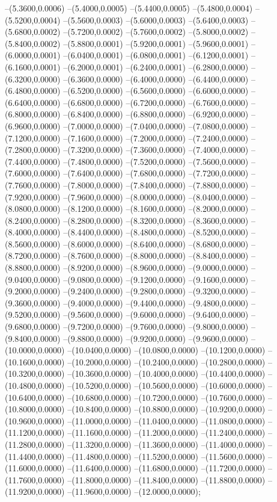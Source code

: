 {	--(5.3600,0.0006)
	--(5.4000,0.0005)
	--(5.4400,0.0005)
	--(5.4800,0.0004)
	--(5.5200,0.0004)
	--(5.5600,0.0003)
	--(5.6000,0.0003)
	--(5.6400,0.0003)
	--(5.6800,0.0002)
	--(5.7200,0.0002)
	--(5.7600,0.0002)
	--(5.8000,0.0002)
	--(5.8400,0.0002)
	--(5.8800,0.0001)
	--(5.9200,0.0001)
	--(5.9600,0.0001)
	--(6.0000,0.0001)
	--(6.0400,0.0001)
	--(6.0800,0.0001)
	--(6.1200,0.0001)
	--(6.1600,0.0001)
	--(6.2000,0.0001)
	--(6.2400,0.0001)
	--(6.2800,0.0000)
	--(6.3200,0.0000)
	--(6.3600,0.0000)
	--(6.4000,0.0000)
	--(6.4400,0.0000)
	--(6.4800,0.0000)
	--(6.5200,0.0000)
	--(6.5600,0.0000)
	--(6.6000,0.0000)
	--(6.6400,0.0000)
	--(6.6800,0.0000)
	--(6.7200,0.0000)
	--(6.7600,0.0000)
	--(6.8000,0.0000)
	--(6.8400,0.0000)
	--(6.8800,0.0000)
	--(6.9200,0.0000)
	--(6.9600,0.0000)
	--(7.0000,0.0000)
	--(7.0400,0.0000)
	--(7.0800,0.0000)
	--(7.1200,0.0000)
	--(7.1600,0.0000)
	--(7.2000,0.0000)
	--(7.2400,0.0000)
	--(7.2800,0.0000)
	--(7.3200,0.0000)
	--(7.3600,0.0000)
	--(7.4000,0.0000)
	--(7.4400,0.0000)
	--(7.4800,0.0000)
	--(7.5200,0.0000)
	--(7.5600,0.0000)
	--(7.6000,0.0000)
	--(7.6400,0.0000)
	--(7.6800,0.0000)
	--(7.7200,0.0000)
	--(7.7600,0.0000)
	--(7.8000,0.0000)
	--(7.8400,0.0000)
	--(7.8800,0.0000)
	--(7.9200,0.0000)
	--(7.9600,0.0000)
	--(8.0000,0.0000)
	--(8.0400,0.0000)
	--(8.0800,0.0000)
	--(8.1200,0.0000)
	--(8.1600,0.0000)
	--(8.2000,0.0000)
	--(8.2400,0.0000)
	--(8.2800,0.0000)
	--(8.3200,0.0000)
	--(8.3600,0.0000)
	--(8.4000,0.0000)
	--(8.4400,0.0000)
	--(8.4800,0.0000)
	--(8.5200,0.0000)
	--(8.5600,0.0000)
	--(8.6000,0.0000)
	--(8.6400,0.0000)
	--(8.6800,0.0000)
	--(8.7200,0.0000)
	--(8.7600,0.0000)
	--(8.8000,0.0000)
	--(8.8400,0.0000)
	--(8.8800,0.0000)
	--(8.9200,0.0000)
	--(8.9600,0.0000)
	--(9.0000,0.0000)
	--(9.0400,0.0000)
	--(9.0800,0.0000)
	--(9.1200,0.0000)
	--(9.1600,0.0000)
	--(9.2000,0.0000)
	--(9.2400,0.0000)
	--(9.2800,0.0000)
	--(9.3200,0.0000)
	--(9.3600,0.0000)
	--(9.4000,0.0000)
	--(9.4400,0.0000)
	--(9.4800,0.0000)
	--(9.5200,0.0000)
	--(9.5600,0.0000)
	--(9.6000,0.0000)
	--(9.6400,0.0000)
	--(9.6800,0.0000)
	--(9.7200,0.0000)
	--(9.7600,0.0000)
	--(9.8000,0.0000)
	--(9.8400,0.0000)
	--(9.8800,0.0000)
	--(9.9200,0.0000)
	--(9.9600,0.0000)
	--(10.0000,0.0000)
	--(10.0400,0.0000)
	--(10.0800,0.0000)
	--(10.1200,0.0000)
	--(10.1600,0.0000)
	--(10.2000,0.0000)
	--(10.2400,0.0000)
	--(10.2800,0.0000)
	--(10.3200,0.0000)
	--(10.3600,0.0000)
	--(10.4000,0.0000)
	--(10.4400,0.0000)
	--(10.4800,0.0000)
	--(10.5200,0.0000)
	--(10.5600,0.0000)
	--(10.6000,0.0000)
	--(10.6400,0.0000)
	--(10.6800,0.0000)
	--(10.7200,0.0000)
	--(10.7600,0.0000)
	--(10.8000,0.0000)
	--(10.8400,0.0000)
	--(10.8800,0.0000)
	--(10.9200,0.0000)
	--(10.9600,0.0000)
	--(11.0000,0.0000)
	--(11.0400,0.0000)
	--(11.0800,0.0000)
	--(11.1200,0.0000)
	--(11.1600,0.0000)
	--(11.2000,0.0000)
	--(11.2400,0.0000)
	--(11.2800,0.0000)
	--(11.3200,0.0000)
	--(11.3600,0.0000)
	--(11.4000,0.0000)
	--(11.4400,0.0000)
	--(11.4800,0.0000)
	--(11.5200,0.0000)
	--(11.5600,0.0000)
	--(11.6000,0.0000)
	--(11.6400,0.0000)
	--(11.6800,0.0000)
	--(11.7200,0.0000)
	--(11.7600,0.0000)
	--(11.8000,0.0000)
	--(11.8400,0.0000)
	--(11.8800,0.0000)
	--(11.9200,0.0000)
	--(11.9600,0.0000)
	--(12.0000,0.0000);
}
